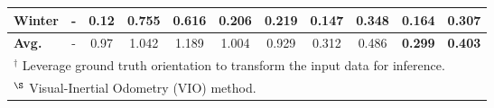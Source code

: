 \begin{table}[h]
{\begin{tabular}{l|cc|cc|cc|cc|cc}
        Winter & - & \textbf{0.12} & 0.755 & 0.616 & 0.206 & 0.219 & \textbf{0.147} & 0.348 & 0.164 & 0.307 \\
        \midrule
        \textbf{Avg.} & - & 0.97 & 1.042 & 1.189 & 1.004 & 0.929 & 0.312 & 0.486 & \textbf{0.299} & \textbf{0.403} \\
        \bottomrule
        \multicolumn{11}{l}{$^\dagger$ Leverage ground truth orientation to transform the input data for inference.}\\
        \multicolumn{11}{l}{$^\S$ Visual-Inertial Odometry (VIO) method.}\\
    \end{tabular}
    }
\end{table}


 